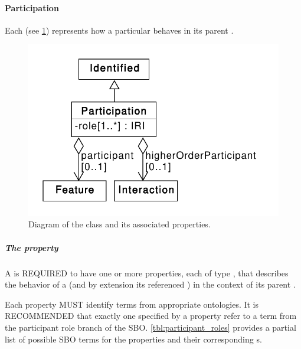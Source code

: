 \paragraph{Participation}
\label{sec:Participation}

Each  (see \ref{uml:participation}) represents how a particular  behaves in its parent .

\begin{figure}[ht]
\begin{center}
\includegraphics[scale=0.6]{uml/participation}
\caption[]{Diagram of the  class and its associated properties.}
\label{uml:participation}
\end{center}
\end{figure}

\subparagraph{The  property}\label{sec:role:P}

A  is REQUIRED to have one or more  properties, each of type , that describes the behavior of a  (and by extension its referenced ) in the context of its parent .

Each  property MUST identify terms from appropriate ontologies. It is RECOMMENDED that exactly one  specified by a  property refer to a term from the participant role branch of the SBO. \ref{tbl:participant_roles} provides a partial list of possible SBO terms for the  properties and their corresponding s.

